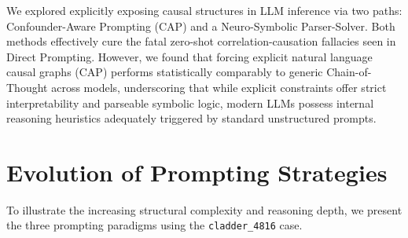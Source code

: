 \documentclass{article}
\theoremstyle{plain}
\theoremstyle{definition}
\theoremstyle{remark}
\begin{document}
We explored explicitly exposing causal structures in LLM inference via two paths: Confounder-Aware Prompting (CAP) and a Neuro-Symbolic Parser-Solver. Both methods effectively cure the fatal zero-shot correlation-causation fallacies seen in Direct Prompting. However, we found that forcing explicit natural language causal graphs (CAP) performs statistically comparably to generic Chain-of-Thought across models, underscoring that while explicit constraints offer strict interpretability and parseable symbolic logic, modern LLMs possess internal reasoning heuristics adequately triggered by standard unstructured prompts.



\clearpage




\newpage
\appendix
\onecolumn

\section{Evolution of Prompting Strategies}
\label{appendix:evolution}

To illustrate the increasing structural complexity and reasoning depth, we present the three prompting paradigms using the \texttt{cladder\_4816} case.
\end{document}
